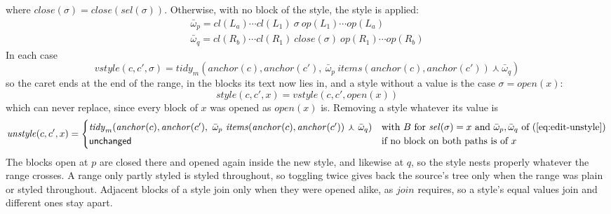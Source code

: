 \documentclass[11pt]{article}
\numberwithin{equation}{section}
\newcommand{\kw}[1]{\ensuremath{\mathsf{#1}}}
\newcommand{\crt}{\mathord{\curlywedge}}
\begin{document}
where $\mathit{close}(\sigma) = \mathit{close}(\mathit{sel}(\sigma))$.
Otherwise, with no block of the style, the style is applied:
\begin{equation}\label{eq:edit-restyle}
\begin{gathered}
\bar\omega_p = \mathit{cl}(L_a) \cdots \mathit{cl}(L_1)\ \sigma\
  \mathit{op}(L_1) \cdots \mathit{op}(L_a)
\\
\bar\omega_q = \mathit{cl}(R_b) \cdots \mathit{cl}(R_1)\
  \mathit{close}(\sigma)\ \mathit{op}(R_1) \cdots \mathit{op}(R_b)
\end{gathered}
\end{equation}
In each case
\begin{equation}\label{eq:edit-vstyle}
\mathit{vstyle}(c, c', \sigma) = \mathit{tidy}_m(\mathit{anchor}(c),
  \mathit{anchor}(c'),\ \bar\omega_p\ \mathit{items}(\mathit{anchor}(c),
  \mathit{anchor}(c'))\ \crt\ \bar\omega_q)
\end{equation}
so the caret ends at the end of the range, in the blocks its text now lies
in, and a style without a value is the case $\sigma = \mathit{open}(x)$:
\begin{equation}\label{eq:edit-style}
\mathit{style}(c, c', x) = \mathit{vstyle}(c, c', \mathit{open}(x))
\end{equation}
which can never replace, since every block of $x$ was opened as
$\mathit{open}(x)$ is.  Removing a style whatever its value is
\begin{equation}\label{eq:edit-unstyle-any}
\mathit{unstyle}(c, c', x) =
\begin{cases}
\mathit{tidy}_m(\mathit{anchor}(c), \mathit{anchor}(c'),\
  \bar\omega_p\ \mathit{items}(\mathit{anchor}(c), \mathit{anchor}(c'))\
  \crt\ \bar\omega_q) & \text{with } B \text{ for } \mathit{sel}(\sigma) = x
  \text{ and } \bar\omega_p, \bar\omega_q \text{ of
  (\ref{eq:edit-unstyle})} \\
\kw{unchanged} & \text{if no block on both paths is of } x
\end{cases}
\end{equation}
The blocks open at $p$ are closed there and opened again inside the new
style, and likewise at $q$, so the style nests properly whatever the range
crosses.  A range only partly styled is styled throughout, so toggling
twice gives back the source's tree only when the range was plain or
styled throughout.  Adjacent blocks of a style join only when they were
opened alike, as $\mathit{join}$ requires, so a style's equal values join and
different ones stay apart.
\end{document}
